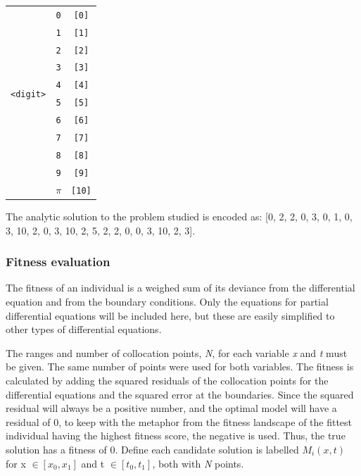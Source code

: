 \documentclass[multicolumn, 10pt]{extarticle}
\begin{document}
\begin{table}[h]
\begin{tabular}{ccc}
		\midrule

		\multirow{10}{*}{\texttt{<digit>}}
		     & \multicolumn{1}{c}{\texttt{0}}                  & \multicolumn{1}{c}{\texttt{[0]}}  \\
		     & \multicolumn{1}{c}{\texttt{1}}                  & \multicolumn{1}{c}{\texttt{[1]}}  \\
		     & \multicolumn{1}{c}{\texttt{2}}                  & \multicolumn{1}{c}{\texttt{[2]}}  \\
		     & \multicolumn{1}{c}{\texttt{3}}                  & \multicolumn{1}{c}{\texttt{[3]}}  \\
		     & \multicolumn{1}{c}{\texttt{4}}                  & \multicolumn{1}{c}{\texttt{[4]}}  \\
		     & \multicolumn{1}{c}{\texttt{5}}                  & \multicolumn{1}{c}{\texttt{[5]}}  \\
		     & \multicolumn{1}{c}{\texttt{6}}                  & \multicolumn{1}{c}{\texttt{[6]}}  \\
		     & \multicolumn{1}{c}{\texttt{7}}                  & \multicolumn{1}{c}{\texttt{[7]}}  \\
		     & \multicolumn{1}{c}{\texttt{8}}                  & \multicolumn{1}{c}{\texttt{[8]}}  \\
		     & \multicolumn{1}{c}{\texttt{9}}                  & \multicolumn{1}{c}{\texttt{[9]}}  \\
		     & \multicolumn{1}{c}{\texttt{$\pi$}}              & \multicolumn{1}{c}{\texttt{[10]}} \\

		\bottomrule
	\end{tabular}
\end{table}


The analytic solution to the problem studied is encoded as: [0, 2, 2, 0, 3, 0, 1, 0, 3, 10, 2, 0, 3, 10, 2, 5, 2, 2, 0, 0, 3, 10, 2, 3].

\subsubsection{Fitness evaluation}
The fitness of an individual is a weighed sum of its deviance from the differential equation and from the boundary conditions. Only the equations for partial differential equations will be included here, but these are easily simplified to other types of differential equations.

The ranges and number of collocation points, \textit{N}, for each variable \textit{x} and \textit{t} must be given. The same number of points were used for both variables. The fitness is calculated by adding the squared residuals of the collocation points for the differential equations and the squared error at the boundaries. Since the squared residual will always be a positive number, and the optimal model will have a residual of 0, to keep with the metaphor from the fitness landscape of the fittest individual having the highest fitness score, the negative is used. Thus, the true solution has a fitness of 0. Define each candidate solution is labelled $M_{i}(x, t)$ for x $\in [x_{0}, x_{1}]$ and t $\in [t_{0}, t_{1}]$, both with \textit{N} points.
\end{document}
